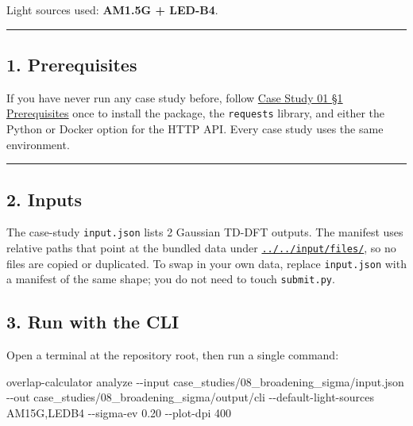 \documentclass[
  11pt,
]{article}
\newenvironment{Shaded}{}{}
\newcommand{\AttributeTok}[1]{\textcolor[rgb]{0.49,0.56,0.16}{#1}}
\newcommand{\ExtensionTok}[1]{#1}
\newcommand{\NormalTok}[1]{#1}
\begin{document}
Light sources used: \textbf{AM1.5G + LED-B4}.

\begin{center}\rule{0.5\linewidth}{0.5pt}\end{center}

\hypertarget{1-prerequisites}{
\subsection{1. Prerequisites}\label{1-prerequisites}}

If you have never run any case study before, follow
\href{https://github.com/pinarsyt/overlap-calculator/blob/main/case_studies/01_theoretical_only/README.md\#1-prerequisites}{Case
Study 01 §1 Prerequisites} once to install the package, the
\texttt{requests} library, and either the Python or Docker option for
the HTTP API. Every case study uses the same environment.

\begin{center}\rule{0.5\linewidth}{0.5pt}\end{center}

\hypertarget{2-inputs}{
\subsection{2. Inputs}\label{2-inputs}}

The case-study \texttt{input.json} lists 2 Gaussian TD-DFT outputs. The
manifest uses relative paths that point at the bundled data under
\href{https://github.com/pinarsyt/overlap-calculator/blob/main/input/files}{\texttt{../../input/files/}},
so no files are copied or duplicated. To swap in your own data, replace
\texttt{input.json} with a manifest of the same shape; you do not need
to touch \texttt{submit.py}.

\hypertarget{3-run-with-the-cli}{
\subsection{3. Run with the CLI}\label{3-run-with-the-cli}}

Open a terminal at the repository root, then run a single command:

\begin{Shaded}
\begin{Highlighting}[]
\ExtensionTok{overlap{-}calculator}\NormalTok{ analyze }\AttributeTok{{-}{-}input}\NormalTok{ case\_studies/08\_broadening\_sigma/input.json }\AttributeTok{{-}{-}out}\NormalTok{ case\_studies/08\_broadening\_sigma/output/cli }\AttributeTok{{-}{-}default{-}light{-}sources}\NormalTok{ AM15G,LEDB4 }\AttributeTok{{-}{-}sigma{-}ev}\NormalTok{ 0.20 }\AttributeTok{{-}{-}plot{-}dpi}\NormalTok{ 400}
\end{Highlighting}
\end{Shaded}
\end{document}
